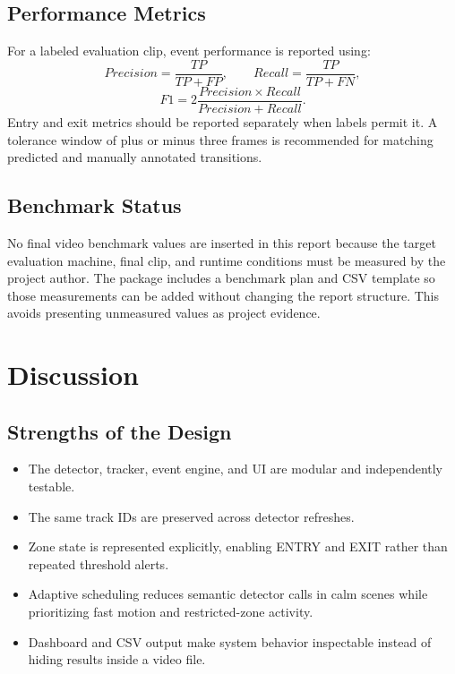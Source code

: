 \documentclass[12pt,a4paper]{report}
\begin{document}
\section{Performance Metrics}
For a labeled evaluation clip, event performance is reported using:
\[
Precision = \frac{TP}{TP+FP}, \qquad Recall = \frac{TP}{TP+FN},
\]
\[
F1 = 2\frac{Precision\times Recall}{Precision+Recall}.
\]
Entry and exit metrics should be reported separately when labels permit it. A tolerance window of plus or minus three frames is recommended for matching predicted and manually annotated transitions.

\section{Benchmark Status}
No final video benchmark values are inserted in this report because the target evaluation machine, final clip, and runtime conditions must be measured by the project author. The package includes a benchmark plan and CSV template so those measurements can be added without changing the report structure. This avoids presenting unmeasured values as project evidence.

\chapter{Discussion}
\section{Strengths of the Design}
\begin{itemize}[leftmargin=*]
  \item The detector, tracker, event engine, and UI are modular and independently testable.
  \item The same track IDs are preserved across detector refreshes.
  \item Zone state is represented explicitly, enabling ENTRY and EXIT rather than repeated threshold alerts.
  \item Adaptive scheduling reduces semantic detector calls in calm scenes while prioritizing fast motion and restricted-zone activity.
  \item Dashboard and CSV output make system behavior inspectable instead of hiding results inside a video file.
\end{itemize}
\end{document}
